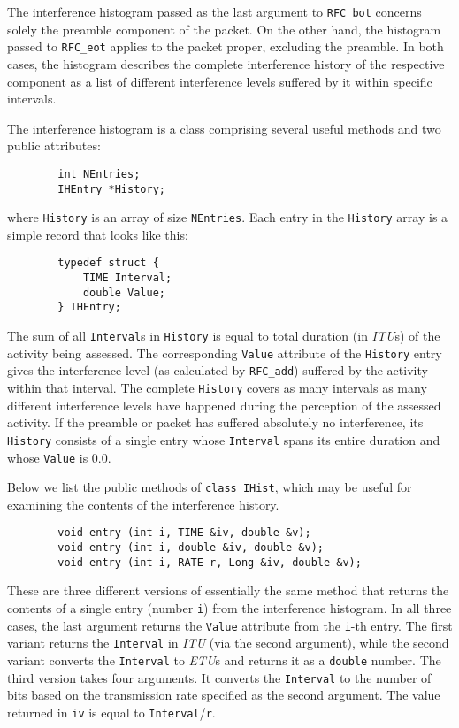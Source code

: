The interference histogram passed as the last argument to
{\tt RFC\_bot} concerns solely the preamble component of the packet.
On the other hand, the histogram passed to
{\tt RFC\_eot}
applies to the packet proper, excluding the preamble.
In both cases, the histogram describes the complete interference
history of the respective component as a list of different interference
levels suffered by it within specific intervals.

The interference histogram is 
a class comprising several useful methods and two public attributes:
\begin{verbatim}
        int NEntries;
        IHEntry *History;
\end{verbatim}
\noindent
where {\tt History} is an array of size {\tt NEntries}.
Each entry in the {\tt History} array is a simple record that looks
like this:
\begin{verbatim}
        typedef struct {
            TIME Interval;
            double Value;
        } IHEntry;
\end{verbatim}

The sum of all {\tt Interval}s in {\tt History} is equal to total duration
(in {\em ITU\/}s) of the activity being assessed.
The corresponding {\tt Value} attribute of the {\tt History} entry gives the
interference level (as calculated by
{\tt RFC\_add}) suffered by the activity within that interval.
The complete {\tt History} covers as many intervals as many different
interference levels have happened during the perception of the
assessed activity.
If the preamble or packet
has suffered absolutely no interference, its
{\tt History} consists of a single entry whose {\tt Interval} spans its
entire duration and whose {\tt Value} is 0.0.

Below we list the public methods of {\tt class IHist}, which may be useful
for examining the contents of the interference history.

\begin{verbatim}
        void entry (int i, TIME &iv, double &v);
        void entry (int i, double &iv, double &v);
        void entry (int i, RATE r, Long &iv, double &v);
\end{verbatim}
\noindent
These are three different versions of essentially the same
method that returns the contents of
a single entry (number {\tt i}) from the interference histogram.
In all three cases, the last argument returns the {\tt Value} attribute from
the {\tt i}-th entry.
The first variant returns the {\tt Interval} in {\em ITU\/} (via the
second argument), while the second variant converts the {\tt Interval} to
{\em ETU\/}s and returns it as a {\tt double} number.
The third version takes four arguments.
It converts the {\tt Interval} to the number of bits based on the transmission
rate specified as the second argument.
The value returned in {\tt iv} is equal to {\tt Interval}/{\tt r}.

